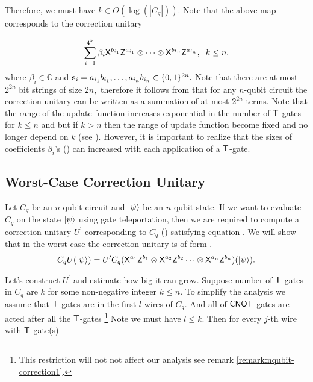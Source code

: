 Therefore, we must have $k\in O(\log(|C_q|)).$ Note that the above map corresponds to the correction unitary 

 \begin{equation}
\label{exp:nqubit-correction}
\sum_{i=1}^{4^k} \beta_i {\sf X}^{b_{i_1}} {\sf Z}^{a_{i_1}}\otimes \cdots \otimes {\sf X}^{b{i_n}} {\sf Z}^{a_{i_n}},\;  \; k\leq n.
\end{equation}
where $\beta_i\in\mathbb{C}$ and ${\bf s}_i=a_{i_1}b_{i_1}, \ldots, a_{i_n}b_{i_n} \in\{0,1\}^{2n}.$  Note that there are at most $2^{2n}$ bit strings of size $2n,$ therefore it follows from  that for any $n$-qubit circuit the correction unitary can be written as a summation of at most $2^{2n}$ terms. Note that the range of the update function increases exponential in the number of ${\sf T}$-gates for $k\leq n$ and but if $k>n$ then the range of update function become fixed and no longer depend on $k$ (see ). However, it is important to realize that the sizes of coefficients $\beta_i$'s () can increased with each application of a ${\sf T}$-gate.

\subsection{Worst-Case Correction Unitary}
Let $C_q$ be an $n$-qubit circuit and ${\lvert}\psi\rangle$ be an $n$-qubit state. If we want to evaluate $C_q$ on the state ${\lvert}\psi\rangle$ using gate teleportation, then we are required to compute a correction unitary $U^\prime$ corresponding to $C_q$ () satisfying equation . We will show that in the worst-case the correction unitary is of form .
\begin{equation}
\label{nqubit:eq6}
C_qU({\lvert}\psi\rangle)= U^\prime C_q ({\sf X}^{a_{1}}{\sf Z}^{b_{1}}\otimes {\sf X}^{a_{2}}{\sf Z}^{b_{2}}\cdots \otimes {\sf X}^{a_{n}}{\sf Z}^{b_{n}})({\lvert}\psi\rangle).
\end{equation}

Let's construct $U^\prime$ and estimate how big it can grow. Suppose number of ${\sf T}$ gates in $C_q$ are $k$ for some non-negative integer $k\leq n.$ To simplify the analysis we assume that ${\sf T}$-gates are in the first $l$ wires of $C_q.$ And all of ${\sf CNOT}$ gates are acted after all the ${\sf T}$-gates \footnote{This restriction will not not affect our analysis see remark \cref{remark:nqubit-correction1}.} Note we must have $l\leq k.$ Then for every $j$-th wire with ${\sf T}$-gate(s)

